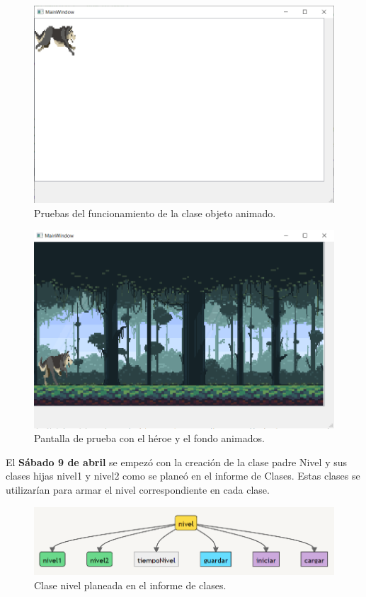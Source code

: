 \documentclass{article}
\begin{document}
\newpage
\begin{figure}[h]
\includegraphics[scale=0.6]{Images/animacionInicial.png}
\centering
\caption{Pruebas del funcionamiento de la clase objeto animado.}
\label{fig:animacion1}
\end{figure}

\begin{figure}[h]
\includegraphics[scale=0.6]{Images/animaciones.png}
\centering
\caption{Pantalla de prueba con el héroe y el fondo animados.}
\label{fig:animacion}
\end{figure}

El \textbf{Sábado 9 de abril} se empezó con la creación de la clase padre Nivel y sus clases hijas nivel1 y nivel2 como se planeó en el informe de Clases. Estas clases se utilizarían para armar el nivel correspondiente en cada clase.

\newpage
\begin{figure}[h]
\includegraphics[scale=0.6]{Images/niveles.png}
\centering
\caption{Clase nivel planeada en el informe de clases.}
\label{fig:niveles}
\end{figure}
\end{document}
